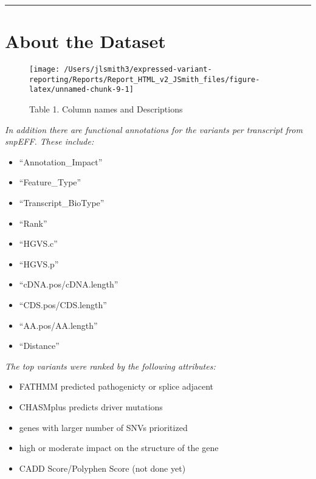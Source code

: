 \documentclass[
]{article}
\providecommand{\tightlist}{%
  \setlength{\itemsep}{0pt}\setlength{\parskip}{0pt}}
\begin{document}
\begin{center}\rule{0.5\linewidth}{0.5pt}\end{center}

\hypertarget{about-the-dataset}{%
\section{About the Dataset}\label{about-the-dataset}}

\begin{figure}

{\centering \texttt{[image: /Users/jlsmith3/expressed-variant-reporting/Reports/Report\_HTML\_v2\_JSmith\_files/figure-latex/unnamed-chunk-9-1]} 

}

\caption{Table 1. Column names and Descriptions}\label{fig:unnamed-chunk-9}
\end{figure}

\emph{In addition there are functional annotations for the variants per
transcript from snpEFF. These include:}

\begin{itemize}
\tightlist
\item
  ``Annotation\_Impact''
\item
  ``Feature\_Type''
\item
  ``Transcript\_BioType''
\item
  ``Rank''
\item
  ``HGVS.c''
\item
  ``HGVS.p''
\item
  ``cDNA.pos/cDNA.length''
\item
  ``CDS.pos/CDS.length''
\item
  ``AA.pos/AA.length''
\item
  ``Distance''
\end{itemize}

\emph{The top variants were ranked by the following attributes:}

\begin{itemize}
\tightlist
\item
  FATHMM predicted pathogenicty or splice adjacent
\item
  CHASMplus predicts driver mutations
\item
  genes with larger number of SNVs prioritized
\item
  high or moderate impact on the structure of the gene
\item
  CADD Score/Polyphen Score (not done yet)
\end{itemize}
\end{document}
